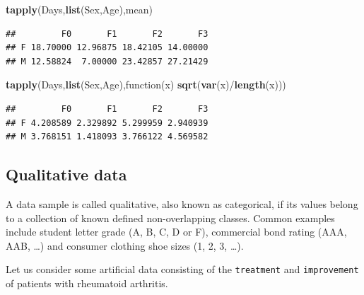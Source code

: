 \documentclass[]{article}
\newenvironment{Shaded}{\begin{snugshade}}{\end{snugshade}}
\newcommand{\KeywordTok}[1]{\textcolor[rgb]{0.13,0.29,0.53}{\textbf{{#1}}}}
\newcommand{\NormalTok}[1]{{#1}}
\numberwithin{equation}{section}
\begin{document}
\begin{Shaded}
\begin{Highlighting}[]
\KeywordTok{tapply}\NormalTok{(Days,}\KeywordTok{list}\NormalTok{(Sex,Age),mean)}
\end{Highlighting}
\end{Shaded}

\begin{verbatim}
##         F0       F1       F2       F3
## F 18.70000 12.96875 18.42105 14.00000
## M 12.58824  7.00000 23.42857 27.21429
\end{verbatim}

\begin{Shaded}
\begin{Highlighting}[]
\KeywordTok{tapply}\NormalTok{(Days,}\KeywordTok{list}\NormalTok{(Sex,Age),function(x) }\KeywordTok{sqrt}\NormalTok{(}\KeywordTok{var}\NormalTok{(x)/}\KeywordTok{length}\NormalTok{(x)))}
\end{Highlighting}
\end{Shaded}

\begin{verbatim}
##         F0       F1       F2       F3
## F 4.208589 2.329892 5.299959 2.940939
## M 3.768151 1.418093 3.766122 4.569582
\end{verbatim}

\subsection{Qualitative data}\label{qualitative-data}

A data sample is called qualitative, also known as categorical, if its
values belong to a collection of known defined non-overlapping classes.
Common examples include student letter grade (A, B, C, D or F),
commercial bond rating (AAA, AAB, \ldots{}) and consumer clothing shoe
sizes (1, 2, 3, \ldots{}).

Let us consider some artificial data consisting of the
\texttt{treatment} and \texttt{improvement} of patients with rheumatoid
arthritis.
\end{document}
